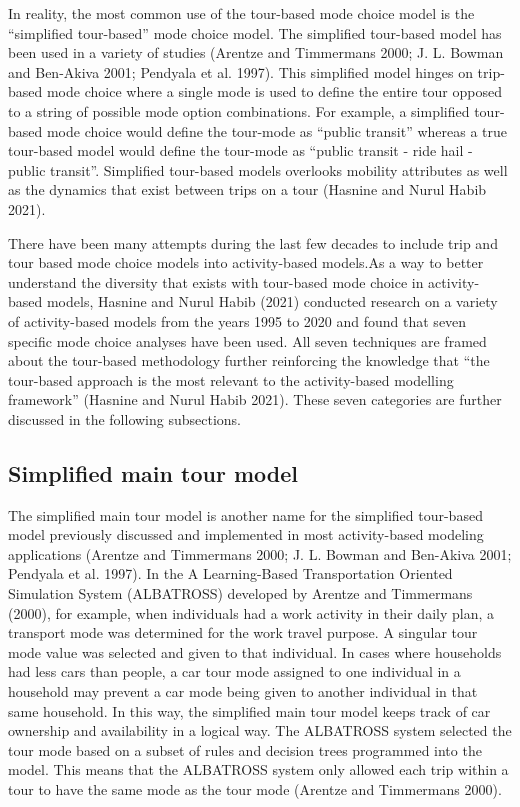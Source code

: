 \documentclass[12pt, oneside, openright]{byuthesis}
\begin{document}
In reality, the most common use of the tour-based mode choice model is the ``simplified tour-based'' mode choice model. The simplified tour-based model has been used in a variety of studies (Arentze and Timmermans 2000; J. L. Bowman and Ben-Akiva 2001; Pendyala et al. 1997). This simplified model hinges on trip-based mode choice where a single mode is used to define the entire tour opposed to a string of possible mode option combinations. For example, a simplified tour-based mode choice would define the tour-mode as ``public transit'' whereas a true tour-based model would define the tour-mode as ``public transit - ride hail - public transit''. Simplified tour-based models overlooks mobility attributes as well as the dynamics that exist between trips on a tour (Hasnine and Nurul Habib 2021).

There have been many attempts during the last few decades to include trip and tour based mode choice models into activity-based models.As a way to better understand the diversity that exists with tour-based mode choice in activity-based models, Hasnine and Nurul Habib (2021) conducted research on a variety of activity-based models from the years 1995 to 2020 and found that seven specific mode choice analyses have been used. All seven techniques are framed about the tour-based methodology further reinforcing the knowledge that ``the tour-based approach is the most relevant to the activity-based modelling framework'' (Hasnine and Nurul Habib 2021). These seven categories are further discussed in the following subsections.

\hypertarget{simplified-main-tour-model}{%
\subsection{Simplified main tour model}\label{simplified-main-tour-model}}

The simplified main tour model is another name for the simplified tour-based model previously discussed and implemented in most activity-based modeling applications (Arentze and Timmermans 2000; J. L. Bowman and Ben-Akiva 2001; Pendyala et al. 1997). In the A Learning-Based Transportation Oriented Simulation System (ALBATROSS) developed by Arentze and Timmermans (2000), for example, when individuals had a work activity in their daily plan, a transport mode was determined for the work travel purpose. A singular tour mode value was selected and given to that individual. In cases where households had less cars than people, a car tour mode assigned to one individual in a household may prevent a car mode being given to another individual in that same household. In this way, the simplified main tour model keeps track of car ownership and availability in a logical way. The ALBATROSS system selected the tour mode based on a subset of rules and decision trees programmed into the model. This means that the ALBATROSS system only allowed each trip within a tour to have the same mode as the tour mode (Arentze and Timmermans 2000).
\end{document}
